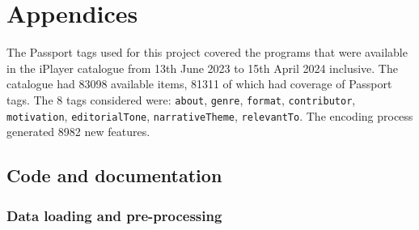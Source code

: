 \section{Appendices}

The Passport tags used for this project covered the programs that were available in the iPlayer catalogue
from 13th June 2023 to 15th April 2024 inclusive. The catalogue had 83098 available items, 81311 of which had coverage of Passport tags.
The 8 tags considered were: \verb|about|, \verb|genre|, \verb|format|, \verb|contributor|, \verb|motivation|, \verb|editorialTone|, \verb|narrativeTheme|, \verb|relevantTo|.
The encoding process generated 8982 new features.

\subsection{Code and documentation}

\subsubsection{Data loading and pre-processing}


